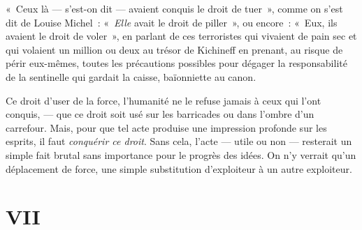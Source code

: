 \documentclass[french,twoside]{book} %
\begin{document}
« Ceux là — s’est-on dit — avaient conquis le droit de tuer », comme on s’est dit de Louise Michel : « \emph{Elle} avait le droit de piller », ou encore : « Eux, ils avaient le droit de voler », en parlant de ces terroristes qui vivaient de pain sec et qui volaient un million ou deux au trésor de Kichineff en prenant, au risque de périr eux-mêmes, toutes les précautions possibles pour dégager la responsabilité de la sentinelle qui gardait la caisse, baïonniette au canon.\par
\bigbreak
\noindent Ce droit d’user de la force, l’humanité ne le refuse jamais à ceux qui l’ont conquis, — que ce droit soit usé sur les barricades ou dans l’ombre d’un carrefour. Mais, pour que tel acte produise une impression profonde sur les esprits, il faut \emph{conquérir ce droit}. Sans cela, l’acte — utile ou non — resterait un simple fait brutal sans importance pour le progrès des idées. On n’y verrait qu’un déplacement de force, une simple substitution d’exploiteur à un autre exploiteur.
\section[{VII}]{VII}
\label{p07}\renewcommand{\leftmark}{VII}
\end{document}
